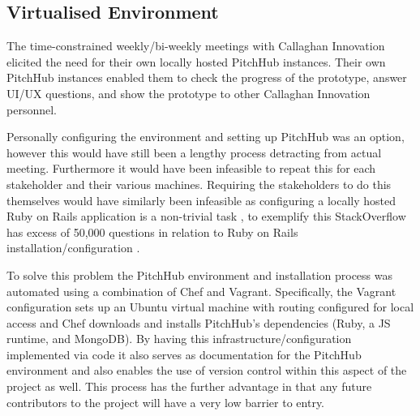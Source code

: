 \subsection{Virtualised Environment}
The time-constrained weekly/bi-weekly meetings with Callaghan Innovation elicited the need for their own locally hosted PitchHub instances. Their own PitchHub instances enabled them to check the progress of the prototype, answer UI/UX questions, and show the prototype to other Callaghan Innovation personnel. 
\par
Personally configuring the environment and setting up PitchHub was an option, however this would have still been a lengthy process detracting from actual meeting. Furthermore it would have been infeasible to repeat this for each stakeholder and their various machines. Requiring the stakeholders to do this themselves would have similarly been infeasible as configuring a locally hosted Ruby on Rails application is a non-trivial task \cite{Roma:personalCommunications}, to exemplify this StackOverflow has excess of 50,000 questions in relation to Ruby on Rails installation/configuration \cite{StackOverflowProblem1:online}\cite{StackOverflowProblem2:online}\cite{StackOverflowProblem3:online}\cite{StackOverflowProblem4:online}.
\par
To solve this problem the PitchHub environment and installation process was automated using a combination of Chef and Vagrant. Specifically, the Vagrant configuration sets up an Ubuntu virtual machine with routing configured for local access and Chef downloads and installs PitchHub's dependencies (Ruby, a JS runtime, and MongoDB). By having this infrastructure/configuration implemented via code it also serves as documentation for the PitchHub environment and also enables the use of version control within this aspect of the project as well. This process has the further advantage in that any future contributors to the project will have a very low barrier to entry.

